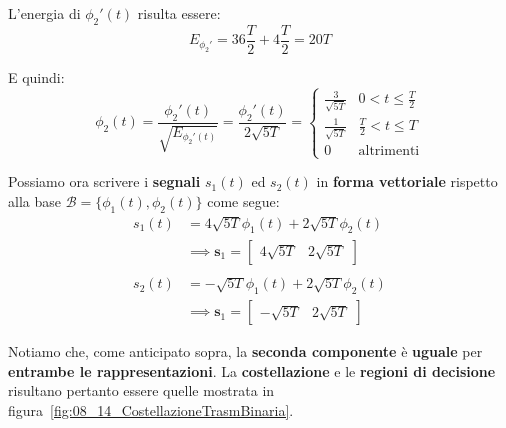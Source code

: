 L'energia di $\phi_{2}'(t)$ risulta essere:
\[
    E_{\phi_{2}'} = 36 \frac{T}{2} + 4 \frac{T}{2} = 20T
\]

E quindi:
\[
    \phi_{2}(t) = \frac{\phi_{2}'(t)}{\sqrt{E_{\phi_{2}'(t)}}} 
    = \frac{\phi_{2}'(t)}{2\sqrt{5T}} = \begin{cases}
        \frac{3}{\sqrt{5T}} & 0 < t \le \frac{T}{2} \\ 
        \frac{1}{\sqrt{5T}} & \frac{T}{2} < t \le T \\ 
        0 & \text{altrimenti}
    \end{cases}
\]

Possiamo ora scrivere i \textbf{segnali} $s_{1}(t)$ ed $s_{2}(t)$ in \textbf{forma vettoriale}
rispetto alla base $\mathcal{B}=\{\phi_{1}(t), \phi_{2}(t)\}$ come segue:
\[
    \begin{aligned}
        s_{1}(t) &= 4\sqrt{5T}\phi_{1}(t) + 2\sqrt{5T}\phi_{2}(t) \\
            &\implies \mathbf{s}_1 = \begin{bmatrix} 4\sqrt{5T} & 2\sqrt{5T} \end{bmatrix}  \\ \\
        s_{2}(t) &= -\sqrt{5T}\phi_{1}(t) + 2\sqrt{5T}\phi_{2}(t) \\
            &\implies \mathbf{s}_1 = \begin{bmatrix} -\sqrt{5T} & 2\sqrt{5T} \end{bmatrix}
    \end{aligned}
\]

Notiamo che, come anticipato sopra, la \textbf{seconda componente} è \textbf{uguale} per
\textbf{entrambe le rappresentazioni}.
La \textbf{costellazione} e le \textbf{regioni di decisione} risultano pertanto 
essere quelle mostrata in figura~\ref{fig:08_14_CostellazioneTrasmBinaria}.

